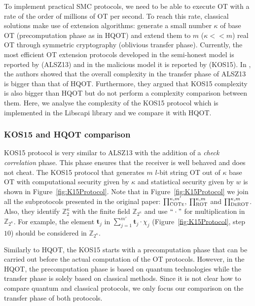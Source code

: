 To implement practical SMC protocols, we need to be able to execute OT with a rate of the order of millions of OT per second. To reach this rate, classical solutions make use of extension algorithms: generate a small number $\kappa$ of base OT (precomputation phase as in HQOT) and extend them to $m$ ($\kappa << m$) real OT through symmetric cryptography \cite{IKNP03} (oblivious transfer phase). Currently, the most efficient OT extension protocols developed in the semi-honest model is reported by \cite{ALSZ13} (ALSZ13) and in the malicious model it is reported by \cite{K15} (KOS15). In \cite{Santos2021}, the authors showed that the overall complexity in the transfer phase of ALSZ13 is bigger than that of HQOT. Furthermore, they argued that KOS15 complexity is also bigger than HQOT but do not perform a complexity comparison between them. Here, we analyse the complexity of the KOS15 protocol which is implemented in the Libscapi library and we compare it with HQOT.

\subsubsection{KOS15 and HQOT comparison}\label{Mal-Ext-OT_comp}

KOS15 protocol is very similar to ALSZ13 with the addition of a \textit{check correlation} phase. This phase ensures that the receiver is well behaved and does not cheat. The KOS15 protocol that generates $m$ $l$-bit string OT out of $\kappa$ base OT with computational security given by $\kappa$ and statistical security given by $w$ is shown in Figure~\ref{fig:K15Protocol}. Note that in Figure~\ref{fig:K15Protocol} we join all the subprotocols presented in the original paper: $\prod^{\kappa, m'}_{\textsc{COTe}}$, $\prod^{\kappa, m}_{\textsc{ROT}}$ and $\prod^{\kappa, m}_{\textsc{DeROT}}$. Also, they identify $\mathbb{Z}^\kappa_2$ with the finite field $\mathbb{Z}_{2^\kappa}$ and use $``\cdot"$ for multiplication in $\mathbb{Z}_{2^\kappa}$. For example, the element $\boldsymbol{t}_j$ in $\sum_{j=1}^{m'} \boldsymbol{t}_j \cdot \chi_j$ (Figure~\ref{fig:K15Protocol}, step $10$) should be considered in $\mathbb{Z}_{2^\kappa}$.

Similarly to HQOT, the KOS15 starts with a precomputation phase that can be carried out before the actual computation of the OT protocols. However, in the HQOT, the precomputation phase is based on quantum technologies while the transfer phase is solely based on classical methods. Since it is not clear how to compare quantum and classical protocols, we only focus our comparison on the transfer phase of both protocols. 

